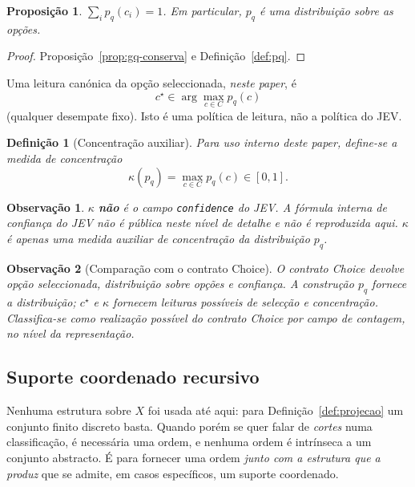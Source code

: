 \documentclass[11pt,a4paper]{article}
\newtheorem{definicao}{Definição}
\newtheorem{proposicao}{Proposição}
\newtheorem{observacao}{Observação}
\begin{document}
\begin{proposicao}
\label{prop:choice-dist}
\(\sum_i p_q(c_i)=1\). Em particular, \(p_q\) é uma distribuição sobre as
opções.
\end{proposicao}

\begin{proof}
Proposição~\ref{prop:gq-conserva} e Definição~\ref{def:pq}.
\end{proof}

Uma leitura canónica da opção seleccionada, \emph{neste paper}, é
\[
c^\star\in\arg\max_{c\in C}p_q(c)
\]
(qualquer desempate fixo). Isto é uma política de leitura, não a política do
JEV.

\begin{definicao}[Concentração auxiliar]
\label{def:concentracao}
Para uso interno deste paper, define-se a medida de concentração
\[
\kappa(p_q)=\max_{c\in C}p_q(c)\in[0,1].
\]
\end{definicao}

\begin{observacao}
\label{obs:confidence}
\(\kappa\) \textbf{não} é o campo \texttt{confidence} do JEV. A fórmula
interna de confiança do JEV não é pública neste nível de detalhe e não é
reproduzida aqui. \(\kappa\) é apenas uma medida auxiliar de concentração da
distribuição \(p_q\).
\end{observacao}

\begin{observacao}[Comparação com o contrato Choice]
\label{obs:choice}
O contrato Choice devolve opção seleccionada, distribuição sobre opções e
confiança. A construção \(p_q\) fornece a distribuição; \(c^\star\) e \(\kappa\)
fornecem leituras possíveis de selecção e concentração.
Classifica-se como realização possível do contrato Choice por campo de
contagem, no nível da representação.
\end{observacao}

\subsection{Suporte coordenado recursivo}
\label{sec:suporte-coordenado}

Nenhuma estrutura sobre \(X\) foi usada até aqui: para Definição~\ref{def:projecao}
um conjunto finito discreto basta. Quando porém se quer falar de \emph{cortes}
numa classificação, é necessária uma ordem, e nenhuma ordem é intrínseca a um
conjunto abstracto. É para fornecer uma ordem \emph{junto com a estrutura que
a produz} que se admite, em casos específicos, um suporte coordenado.
\end{document}
